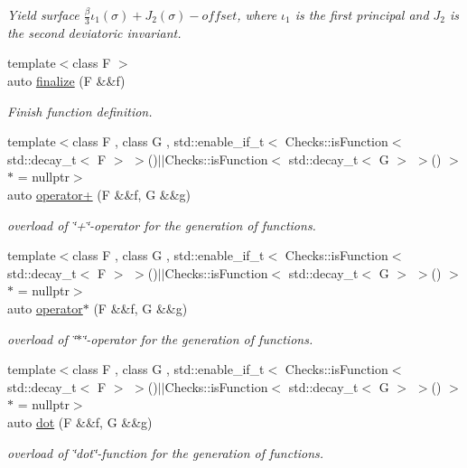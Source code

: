 \begin{DoxyCompactItemize}
\begin{DoxyCompactList}\small\item\em Yield surface $ \frac{\beta}{3}\iota_1(\sigma) + J_2(\sigma)-offset $, where $\iota_1$ is the first principal and $J_2$ is the second deviatoric invariant. \end{DoxyCompactList}\item 
{\footnotesize template$<$class F $>$ }\\auto \hyperlink{namespaceFunG_ac59f2ececc3cd451860776320a4a93d5}{finalize} (F \&\&f)
\begin{DoxyCompactList}\small\item\em Finish function definition. \end{DoxyCompactList}\item 
{\footnotesize template$<$class F , class G , std\+::enable\+\_\+if\+\_\+t$<$ Checks\+::is\+Function$<$ std\+::decay\+\_\+t$<$ F $>$ $>$()$\vert$$\vert$\+Checks\+::is\+Function$<$ std\+::decay\+\_\+t$<$ G $>$ $>$() $>$ $\ast$  = nullptr$>$ }\\auto \hyperlink{namespaceFunG_a24bb5d609b022030afda2d8589cf5509}{operator+} (F \&\&f, G \&\&g)
\begin{DoxyCompactList}\small\item\em overload of \char`\"{}+\char`\"{}-\/operator for the generation of functions. \end{DoxyCompactList}\item 
{\footnotesize template$<$class F , class G , std\+::enable\+\_\+if\+\_\+t$<$ Checks\+::is\+Function$<$ std\+::decay\+\_\+t$<$ F $>$ $>$()$\vert$$\vert$\+Checks\+::is\+Function$<$ std\+::decay\+\_\+t$<$ G $>$ $>$() $>$ $\ast$  = nullptr$>$ }\\auto \hyperlink{namespaceFunG_a267562e725c73ece1c1d057b5f29511f}{operator$\ast$} (F \&\&f, G \&\&g)
\begin{DoxyCompactList}\small\item\em overload of \char`\"{}$\ast$\char`\"{}-\/operator for the generation of functions. \end{DoxyCompactList}\item 
{\footnotesize template$<$class F , class G , std\+::enable\+\_\+if\+\_\+t$<$ Checks\+::is\+Function$<$ std\+::decay\+\_\+t$<$ F $>$ $>$()$\vert$$\vert$\+Checks\+::is\+Function$<$ std\+::decay\+\_\+t$<$ G $>$ $>$() $>$ $\ast$  = nullptr$>$ }\\auto \hyperlink{namespaceFunG_ac73eb907f3d29a9ea60513a43c658270}{dot} (F \&\&f, G \&\&g)
\begin{DoxyCompactList}\small\item\em overload of \char`\"{}dot\char`\"{}-\/function for the generation of functions. \end{DoxyCompactList}\item 

\end{DoxyCompactItemize}
